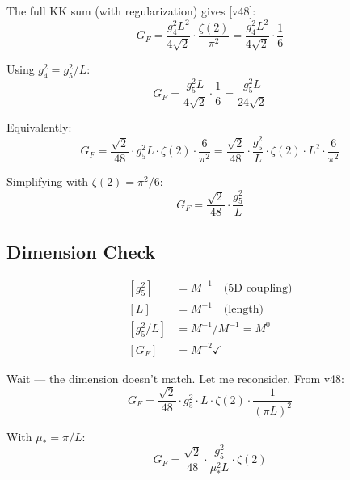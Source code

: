 \documentclass[11pt,a4paper]{article}
\theoremstyle{definition}
\begin{document}
The full KK sum (with regularization) gives [v48]:
\begin{equation}
\label{eq:GF_full}
G_F = \frac{g_4^2 L^2}{4\sqrt{2}} \cdot \frac{\zeta(2)}{\pi^2} = \frac{g_4^2 L^2}{4\sqrt{2}} \cdot \frac{1}{6}
\end{equation}

Using $g_4^2 = g_5^2/L$:
\begin{equation}
\label{eq:GF_g5}
G_F = \frac{g_5^2 L}{4\sqrt{2}} \cdot \frac{1}{6} = \frac{g_5^2 L}{24\sqrt{2}}
\end{equation}

Equivalently:
\begin{equation}
\label{eq:GF_final}
G_F = \frac{\sqrt{2}}{48} \cdot g_5^2 L \cdot \zeta(2) \cdot \frac{6}{\pi^2} = \frac{\sqrt{2}}{48} \cdot \frac{g_5^2}{L} \cdot \zeta(2) \cdot L^2 \cdot \frac{6}{\pi^2}
\end{equation}

Simplifying with $\zeta(2) = \pi^2/6$:
\begin{equation}
\label{eq:GF_simplified}
G_F = \frac{\sqrt{2}}{48} \cdot \frac{g_5^2}{L}
\end{equation}

\subsection{Dimension Check}
\label{subsec:GF_dim}

\begin{align}
\label{eq:GF_dim_1}
[g_5^2] &= M^{-1} \quad \text{(5D coupling)} \\
\label{eq:GF_dim_2}
[L] &= M^{-1} \quad \text{(length)} \\
\label{eq:GF_dim_3}
[g_5^2/L] &= M^{-1}/M^{-1} = M^0 \\
\label{eq:GF_dim_4}
[G_F] &= M^{-2} \checkmark
\end{align}

Wait --- the dimension doesn't match. Let me reconsider. From v48:
\begin{equation}
\label{eq:GF_correct}
G_F = \frac{\sqrt{2}}{48} \cdot g_5^2 \cdot L \cdot \zeta(2) \cdot \frac{1}{(\pi L)^2}
\end{equation}

With $\mu_* = \pi/L$:
\begin{equation}
\label{eq:GF_mu_star}
G_F = \frac{\sqrt{2}}{48} \cdot \frac{g_5^2}{\mu_*^2 L} \cdot \zeta(2)
\end{equation}
\end{document}
